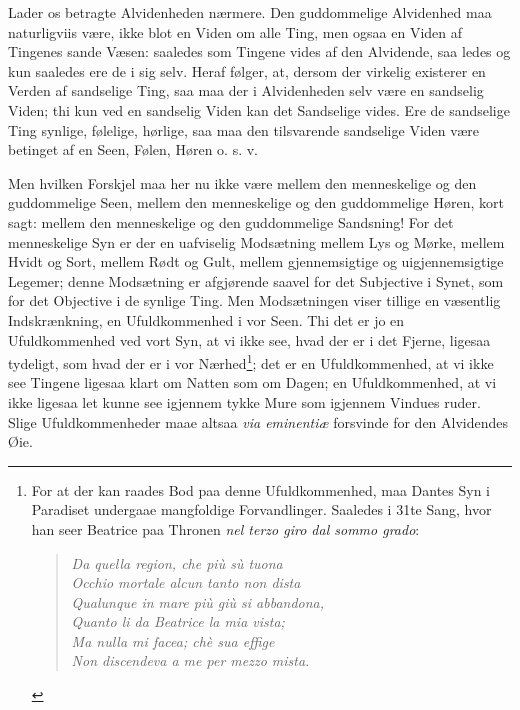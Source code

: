 \documentclass[11pt]{book}
\newcommand{\opage}[1]{\marginnote{\footnotesize\textit{[#1]}}}
\begin{document}
Lader os betragte Alvidenheden nærmere. Den guddommelige Alvidenhed
maa naturligviis være, ikke blot en Viden om alle Ting, men ogsaa en
Viden af Tingenes sande Væsen: saaledes som Tingene vides af den
Alvidende, saa\-%
\opage{45} \setcounter{footnote}{0}%
ledes og kun saaledes ere de i sig selv. Heraf følger, at, dersom
der virkelig existerer en Verden af sandselige Ting, saa maa der i
Alvidenheden selv være en sandselig Viden; thi kun ved en sandselig
Viden kan det Sandselige vides. Ere de sandselige Ting synlige,
følelige, hørlige, saa maa den tilsvarende sandselige Viden være
betinget af en Seen, Følen, Høren o. s. v.

Men hvilken Forskjel maa her nu ikke være mellem den menneskelige og
den guddommelige Seen, mellem den menneskelige og den guddommelige
Høren, kort sagt: mellem den menneskelige og den guddommelige
Sandsning! For det menneskelige Syn er der en uafviselig Modsætning
mellem Lys og Mørke, mellem Hvidt og Sort, mellem Rødt og Gult,
mellem gjennemsigtige og uigjennemsigtige Legemer; denne Modsætning
er afgjørende saavel for det Subjective i Synet, som for det
Objective i de synlige Ting. Men Modsætningen viser tillige en
væsentlig Indskrænkning, en Ufuldkommenhed i vor Seen. Thi det er jo
en Ufuldkommenhed ved vort Syn, at vi ikke see, hvad der er i det
Fjerne, ligesaa tydeligt, som hvad der er i vor
Nærhed\footnote{For at der kan raades Bod paa denne Ufuldkommenhed,
maa Dantes Syn i Paradiset undergaae mangfoldige Forvandlinger.
Saaledes i 31te Sang, hvor han seer Beatrice paa Thronen
\textit{nel terzo giro dal sommo grado}:
\begin{quote}
\textit{Da quella region, che più sù tuona}\\
\textit{Occhio mortale alcun tanto non dista}\\
\textit{Qualunque in mare più giù si abbandona,}\\
\textit{Quanto li da Beatrice la mia vista;}\\
\textit{Ma nulla mi facea; chè sua effige}\\
\textit{Non discendeva a me per mezzo mista.}
\end{quote}}; det er en Ufuldkommenhed, at vi ikke see Tingene
ligesaa klart om Natten som om Dagen; en Ufuldkommenhed, at vi ikke
ligesaa let kunne see igjennem tykke Mure som igjennem Vindues\-%
\opage{46} \setcounter{footnote}{0}%
ruder. Slige Ufuldkommenheder maae altsaa \textit{via eminentiæ}
forsvinde for den Alvidendes Øie.
\end{document}
